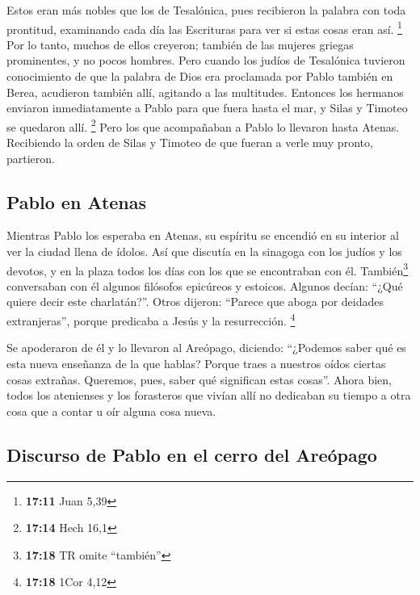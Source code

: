  Estos eran más nobles que los de Tesalónica, pues
recibieron la palabra con toda prontitud, examinando cada día las
Escrituras para ver si estas cosas eran así. \footnote{\textbf{17:11}
  Juan 5,39}  Por lo tanto, muchos de ellos creyeron;
también de las mujeres griegas prominentes, y no pocos hombres.
 Pero cuando los judíos de Tesalónica tuvieron
conocimiento de que la palabra de Dios era proclamada por Pablo también
en Berea, acudieron también allí, agitando a las multitudes.
 Entonces los hermanos enviaron inmediatamente a Pablo
para que fuera hasta el mar, y Silas y Timoteo se quedaron allí.
\footnote{\textbf{17:14} Hech 16,1}  Pero los que
acompañaban a Pablo lo llevaron hasta Atenas. Recibiendo la orden de
Silas y Timoteo de que fueran a verle muy pronto, partieron.

\hypertarget{pablo-en-atenas}{%
\subsection{Pablo en Atenas}\label{pablo-en-atenas}}

 Mientras Pablo los esperaba en Atenas, su espíritu se
encendió en su interior al ver la ciudad llena de ídolos.
 Así que discutía en la sinagoga con los judíos y los
devotos, y en la plaza todos los días con los que se encontraban con él.
 También\footnote{\textbf{17:18} TR omite ``también''}
conversaban con él algunos filósofos epicúreos y estoicos. Algunos
decían: ``¿Qué quiere decir este charlatán?''. Otros dijeron: ``Parece
que aboga por deidades extranjeras'', porque predicaba a Jesús y la
resurrección. \footnote{\textbf{17:18} 1Cor 4,12}

 Se apoderaron de él y lo llevaron al Areópago, diciendo:
``¿Podemos saber qué es esta nueva enseñanza de la que hablas?
 Porque traes a nuestros oídos ciertas cosas extrañas.
Queremos, pues, saber qué significan estas cosas''. 
Ahora bien, todos los atenienses y los forasteros que vivían allí no
dedicaban su tiempo a otra cosa que a contar u oír alguna cosa nueva.

\hypertarget{discurso-de-pablo-en-el-cerro-del-areuxf3pago}{%
\subsection{Discurso de Pablo en el cerro del
Areópago}\label{discurso-de-pablo-en-el-cerro-del-areuxf3pago}}


